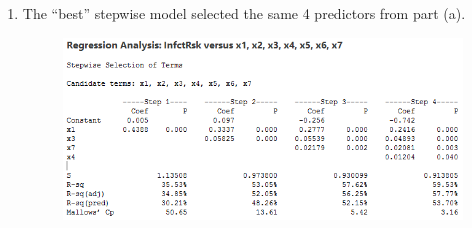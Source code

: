 \documentclass{article}
\providecommand{\tightlist}{%
      \setlength{\itemsep}{0pt}\setlength{\parskip}{0pt}}
\begin{document}
\begin{enumerate}
\def\labelenumi{\alph{enumi})}
\setcounter{enumi}{1}
\tightlist
\item
  The ``best'' stepwise model selected the same 4 predictors from part
  (a).
  
  \begin{figure}[h!]
 \centering
 \includegraphics[scale=.6]{./images/stepwise_regression.png}
\end{figure}
\end{enumerate}
\end{document}
